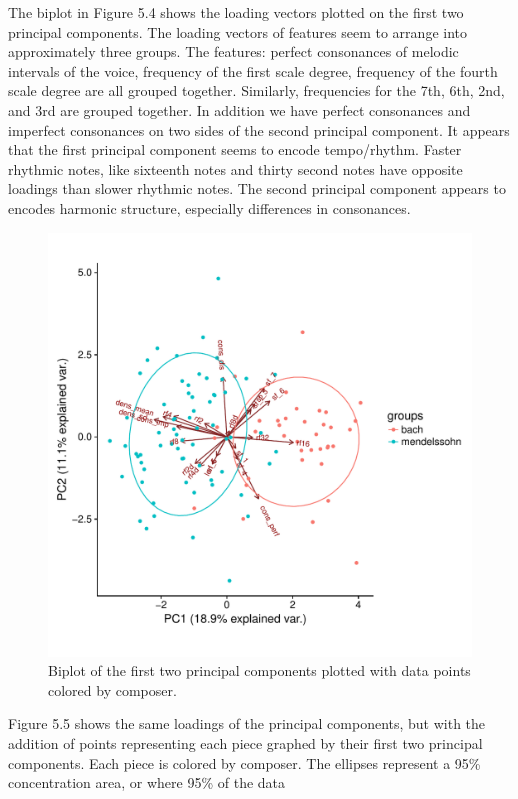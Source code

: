 \documentclass[12pt,twoside]{reedthesis}
\theoremstyle{definition}
\theoremstyle{definition}
\theoremstyle{definition}
\theoremstyle{remark}
\begin{document}
The biplot in Figure 5.4 shows the loading vectors plotted on the first
two principal components. The loading vectors of features seem to
arrange into approximately three groups. The features: perfect
consonances of melodic intervals of the voice, frequency of the first
scale degree, frequency of the fourth scale degree are all grouped
together. Similarly, frequencies for the 7th, 6th, 2nd, and 3rd are
grouped together. In addition we have perfect consonances and imperfect
consonances on two sides of the second principal component. It appears
that the first principal component seems to encode tempo/rhythm. Faster
rhythmic notes, like sixteenth notes and thirty second notes have
opposite loadings than slower rhythmic notes. The second principal
component appears to encodes harmonic structure, especially differences
in consonances.
\begin{figure}[H]
\centering
\includegraphics[scale = .7]{images/bi_elipse12.pdf}
\caption{Biplot of the first two principal components plotted with data points colored by composer. }
\label{subd}
\end{figure}
Figure 5.5 shows the same loadings of the principal components, but with
the addition of points representing each piece graphed by their first
two principal components. Each piece is colored by composer. The
ellipses represent a 95\% concentration area, or where 95\% of the data
\end{document}
